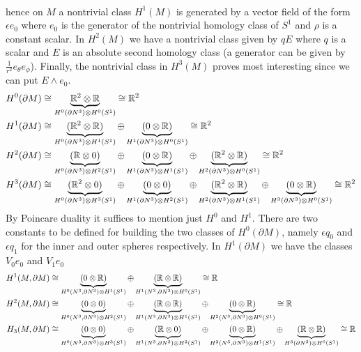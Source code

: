 \documentclass{article}
\begin{document}
\begin{example}
\begin{itemize}
\begin{itemize}
\begin{align*}
\end{align*}
hence on $M$ a nontrivial class $H^1(M)$ is generated by a vector field of the form $\epsilon e_0$ where $e_0$ is the generator of the nontrivial homology class of $S^1$ and $\rho$ is a constant scalar. In $H^2(M)$ we have a nontrivial class given by $q E$ where $q$ is a scalar and $E$ is an absolute second homology class (a generator can be given by $\frac{1}{r^2}e_\theta e_\phi$). Finally, the nontrivial class in $H^3(M)$ proves most interesting since we can put $E\wedge e_0$.
\begin{align*}
    H^0(\partial M) &\cong \underbrace{\mathbb{R}^2 \otimes \mathbb{R}}_{H^0(\partial N^3)\otimes H^0(S^1)} \cong \mathbb{R}^2 \\
    H^1(\partial M) &\cong \underbrace{(\mathbb{R}^2 \otimes \mathbb{R})}_{H^0(\partial N^3)\otimes H^1(S^1)} \oplus \underbrace{(0 \otimes \mathbb{R})}_{H^1(\partial N^3)\otimes H^0(S^1)} \cong \mathbb{R}^2 \\
    H^2(\partial M) &\cong \underbrace{(\mathbb{R} \otimes 0)}_{H^0(\partial N^3)\otimes H^2(S^1)} \oplus \underbrace{(0 \otimes \mathbb{R})}_{H^1(\partial N^3)\otimes H^1(S^1)} \oplus \underbrace{(\mathbb{R}^2 \otimes \mathbb{R})}_{H^2(\partial N^3)\otimes H^0(S^1)} \cong \mathbb{R}^2\\
    H^3(\partial M) &\cong \underbrace{(\mathbb{R}^2 \otimes 0)}_{H^0(\partial N^3)\otimes H^3(S^1)} \oplus \underbrace{(0 \otimes 0)}_{H^1(\partial N^3)\otimes H^2(S^1)} \oplus \underbrace{(\mathbb{R}^2 \otimes \mathbb{R})}_{H^2(\partial N^3)\otimes H^1(S^1)} \oplus \underbrace{(0 \otimes \mathbb{R})}_{H^3(\partial N^3)\otimes H^0(S^1)} \cong \mathbb{R}^2\\
\end{align*}
By Poincare duality it suffices to mention just $H^0$ and $H^1$. There are two constants to be defined for building the two classes of $H^0(\partial M)$, namely $\epsilon q_0$ and $\epsilon q_1$ for the inner and outer spheres respectively. In $H^1(\partial M)$ we have the classes $V_0 e_0$ and $V_1 e_0$
\begin{align*}
    H^1(M,\partial M) &\cong \underbrace{(0 \otimes \R)}_{H^0(N^3,\partial N^3)\otimes H^1(S^1)} \oplus \underbrace{(\R \otimes \R)}_{H^1(N^3,\partial N^3)\otimes H^0(S^1)} \cong \R \\
    H^2(M,\partial M) &\cong \underbrace{(0 \otimes 0)}_{H^0(N^3,\partial N^3)\otimes H^2(S^1)} \oplus \underbrace{(\R \otimes \R)}_{H^1(N^3,\partial N^3)\otimes H^1(S^1)} \oplus \underbrace{(0 \otimes \R)}_{H^2(N^3,\partial N^3)\otimes H^0(S^1)} \cong \R\\
    H_3(M,\partial M) &\cong \underbrace{(0 \otimes 0)}_{H^0(N^3,\partial N^3)\otimes H^3(S^1)} \oplus \underbrace{(\R \otimes 0)}_{H^1(N^3,\partial N^3)\otimes H^2(S^1)} \oplus \underbrace{(0 \otimes \R)}_{H^2(N^3,\partial N^3)\otimes H^1(S^1)} \oplus \underbrace{(\R \otimes \R)}_{H^3(\partial N^3)\otimes H^0(S^1)} \cong \R\\

\end{align*}
\end{itemize}
\end{itemize}
\end{example}
\end{document}
